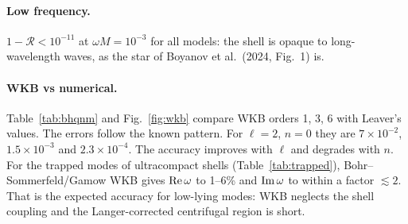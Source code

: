 \documentclass[11pt,a4paper]{article}
\numberwithin{equation}{section}
\begin{document}
\paragraph{Low frequency.} $1-\mathcal R<10^{-11}$ at $\omega M=10^{-3}$ for all models: the shell is
opaque to long-wavelength waves, as the star of Boyanov et al.\ (2024, Fig.~1) is.

\paragraph{WKB vs numerical.} Table~\ref{tab:bhqnm} and Fig.~\ref{fig:wkb} compare WKB orders 1, 3, 6
with Leaver's values. The errors follow the known pattern. For $\ell=2$, $n=0$ they are $7\times10^{-2}$,
$1.5\times10^{-3}$ and $2.3\times10^{-4}$. The accuracy improves with $\ell$ and degrades with $n$. For the
trapped modes of ultracompact shells (Table~\ref{tab:trapped}), Bohr--Sommerfeld/Gamow WKB gives
${\rm Re}\,\omega$ to 1--6\% and ${\rm Im}\,\omega$ to within a factor $\lesssim2$. That is the expected
accuracy for low-lying modes: WKB neglects the shell coupling and the Langer-corrected centrifugal region is
short.

\begin{table}[h]\centering\small
\caption{Schwarzschild QNMs $\omega M$: Leaver continued fraction (this code) vs WKB of orders 1, 3, 6
(hypervirial construction). Literature: Leaver (1985); Berti, Cardoso \& Starinets (2009); Iyer \& Will (1987)
Table~I for 3rd order; Konoplya (2003) for 6th order.}\label{tab:bhqnm}

\end{table}

\begin{table}[h]\centering\small
\caption{Approach to the black-hole reflectivity as $R\to2M$ ($\ell=2$; even parity is model C,
$\Gamma=2$, evaluated in 40-digit arithmetic).}\label{tab:bhlimit}

\end{table}
\end{document}
